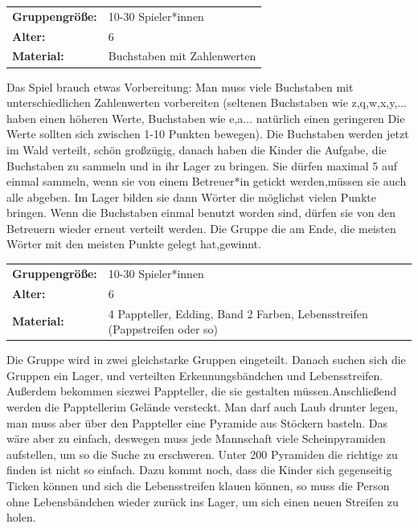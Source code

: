 \newpage
\begin{table}[H]
\begin{tabular}{>{\bfseries}lp{8cm}}
   Gruppengröße:   & 10-30 Spieler*innen\\
    Alter: & 6 \\
    Material: & Buchstaben mit Zahlenwerten \\ 
\end{tabular}
\end{table} 
Das Spiel brauch etwas Vorbereitung: Man muss viele Buchstaben mit unterschiedlichen Zahlenwerten vorbereiten (seltenen Buchstaben wie z,q,w,x,y,... haben einen höheren Werte, Buchstaben wie e,a... natürlich einen geringeren Die Werte sollten sich zwischen 1-10 Punkten bewegen). Die Buchstaben werden jetzt im Wald verteilt, schön großzügig, danach haben die Kinder die Aufgabe, die Buchstaben zu sammeln und in ihr Lager zu bringen. Sie dürfen maximal 5 auf einmal sammeln, wenn sie von einem Betreuer*in getickt werden,müssen sie auch alle abgeben. Im Lager bilden sie dann Wörter die möglichst vielen Punkte bringen. Wenn die Buchstaben einmal benutzt worden sind, dürfen sie von den Betreuern wieder erneut verteilt werden.  Die Gruppe die am Ende, die meisten Wörter mit den meisten Punkte gelegt hat,gewinnt.


\begin{table}[H]
\begin{tabular}{>{\bfseries}lp{8cm}}
   Gruppengröße:   & 10-30 Spieler*innen\\
    Alter: & 6 \\
    Material: & 4 Pappteller, Edding, Band 2 Farben, Lebensstreifen (Pappstreifen oder so) \\ 
\end{tabular}
\end{table} 
Die Gruppe wird in zwei gleichstarke Gruppen eingeteilt. Danach suchen sich die Gruppen ein Lager, und verteilten Erkennungsbändchen und Lebensstreifen. Außerdem bekommen siezwei Pappteller, die sie gestalten müssen.Anschließend werden die Papptellerim Gelände versteckt. Man darf auch Laub drunter legen, man muss aber über den Pappteller eine Pyramide aus Stöckern basteln. Das wäre aber zu einfach, deswegen muss jede Mannschaft viele Scheinpyramiden aufstellen, um so die Suche zu erschweren. Unter 200 Pyramiden die richtige zu finden ist nicht so einfach. Dazu kommt noch, dass die Kinder sich gegenseitig Ticken können und sich die Lebensstreifen klauen können, so muss die Person ohne Lebensbändchen wieder zurück ins Lager, um sich einen neuen Streifen zu holen.

